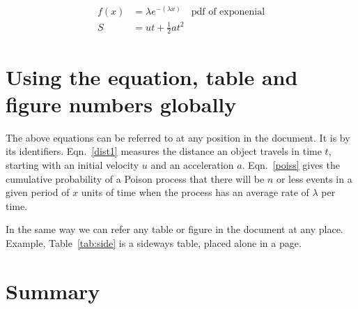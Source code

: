 \begin{align}
f{(x)}&=\lambda e^{-(\lambda x)} \quad \text{pdf of exponenial}\label{exp1}\\
S&=ut+\frac{1}{2}at^2\label{dist1}
\end{align}

\section{Using the equation, table and figure  numbers globally}

The above equations can be referred to at any position in the document. It is by its identifiers. Eqn.~\eqref{dist1} measures the distance an object travels in time $ t $, starting with an initial velocity $ u $ and an acceleration $ a $. Eqn.~\eqref{poiss} gives the cumulative probability of a Poison process that there will be $ n $ or less events in a given period of $ x $ units of time when the process has an average rate of $ \lambda $ per time.

In the same way we can refer any table or figure in the document at any place. Example, Table~\ref{tab:side} is a sideways table, placed alone in a page. 


\section{Summary}
